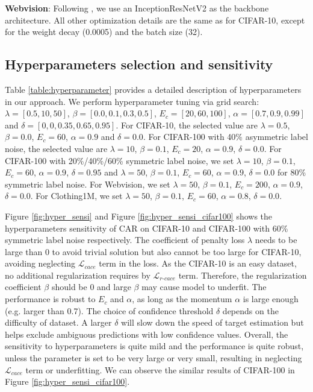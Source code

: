 \documentclass{article}
\begin{document}
\textbf{Webvision}: Following \cite{li2020dividemix,liu2020early}, we use an InceptionResNetV2 as the backbone architecture. All other optimization details are the same as for CIFAR-10, except for the weight decay (0.0005) and the batch size (32).


\subsection{Hyperparameters selection and sensitivity}
\label{sec:hyper_sensi}
Table \ref{table:hyperparameter} provides a detailed description of hyperparameters in our approach. We perform hyperparameter tuning via grid search: $\lambda=[0.5,10, 50]$, $\beta=[0.0,0.1,0.3,0.5]$, $E_{c}=[20,60,100]$, $\alpha=[0.7,0.9,0.99]$ and $\delta=[0,0,0.35,0.65,0.95]$. For CIFAR-10, the selected value are $\lambda=0.5$, $\beta=0.0$, $E_{c}=60$, $\alpha=0.9$ and $\delta=0.0$. For CIFAR-100 with 40\% asymmetric label noise, the selected value are $\lambda=10$, $\beta=0.1$, $E_{c}=20$, $\alpha=0.9$, $\delta=0.0$. For CIFAR-100 with 20\%/40\%/60\% symmetric label noise, we set $\lambda=10$, $\beta=0.1$, $E_{c}=60$, $\alpha=0.9$, $\delta=0.95$ and $\lambda=50$, $\beta=0.1$, $E_{c}=60$, $\alpha=0.9$, $\delta=0.0$ for 80\% symmetric label noise. For Webvision, we set  $\lambda=50$, $\beta=0.1$, $E_{c}=200$, $\alpha=0.9$, $\delta=0.0$. For Clothing1M, we set  $\lambda=50$, $\beta=0.1$, $E_{c}=60$, $\alpha=0.8$, $\delta=0.0$.

Figure \ref{fig:hyper_sensi} and Figure \ref{fig:hyper_sensi_cifar100} shows the hyperparameters sensitivity of CAR on CIFAR-10 and CIFAR-100 with 60\% symmetric label noise respectively. The coefficient of penalty loss $\lambda$ needs to be large than 0 to avoid trivial solution but also cannot be too large for CIFAR-10, avoiding neglecting $\mathcal{L}_{cace}$ term in the loss. As the CIFAR-10 is an easy dataset, no additional regularization requires by $\mathcal{L}_{r\text{-}cace}$ term. Therefore, the regularization coefficient $\beta$ should be 0 and large $\beta$ may cause model to underfit. The performance is robust to $E_{c}$ and $\alpha$, as long as the momentum $\alpha$ is large enough (e.g. larger than 0.7). The choice of confidence threshold $\delta$ depends on the difficulty of dataset. A larger $\delta$ will slow down the speed of target estimation but helps exclude ambiguous predictions with low confidence values. Overall, the sensitivity to hyperparameters is quite mild and the performance is quite robust, unless the parameter is set to be very large or very small, resulting in neglecting $\mathcal{L}_{cace}$ term or underfitting. We can observe the similar results of CIFAR-100 in Figure \ref{fig:hyper_sensi_cifar100}.
\end{document}
